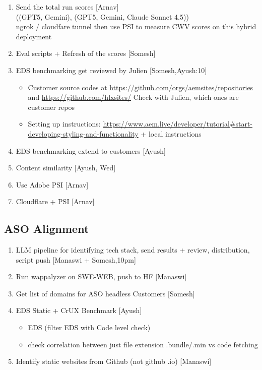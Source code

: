 \begin{enumerate}
    \item Send the total run scores [Arnav] \\
     ((GPT5, Gemini), (GPT5, Gemini, Claude Sonnet 4.5)) \\
     ngrok / cloudfare tunnel then use PSI to measure CWV scores on this hybrid deployment
    \item Eval scripts + Refresh of the scores [Somesh]
    \item EDS benchmarking get reviewed by Julien [Somesh,Ayush:10]
    \begin{itemize}
        \item Customer source codes at \url{https://github.com/orgs/aemsites/repositories} and \url{https://github.com/hlxsites/} Check with Julien, which ones are customer repos
        \item Setting up instructions: \url{https://www.aem.live/developer/tutorial\#start-developing-styling-and-functionality} + local instructions
    \end{itemize}
    \item EDS benchmarking extend to customers [Ayush]
    \item Content similarity [Ayush, Wed]
    \item Use Adobe PSI [Arnav]
    \item Cloudflare + PSI [Arnav]
\end{enumerate}
\subsection{ASO Alignment}
\begin{enumerate}
    \item LLM pipeline for identifying tech stack, send results + review, distribution, script push [Manaswi + Somesh,10pm]
    \item Run wappalyzer on SWE-WEB, push to HF [Manaswi]
    \item Get list of domains for ASO headless Customers [Somesh] 
    \item EDS Static + CrUX Benchmark [Ayush] 
    \begin{itemize}
        \item EDS (filter EDS with Code level check)
        \item check correlation between just file extension .bundle/.min vs code fetching
    \end{itemize}
    \item Identify static websites from Github (not github .io) [Manaswi]
\end{enumerate}

